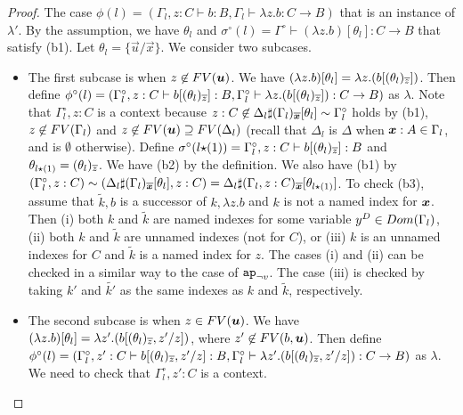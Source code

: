 \begin{proof}
  The case $\phi(l) = (\Gamma_l, z:C\vdash b:B,\Gamma_l\vdash \lambda z.b:C\to B)$
  that is an instance of $\lambda'$. 
  By the assumption, we have $\theta_l$
  and $\sigma^\circ(l)=\Gamma^\circ\vdash (\lambda z.b)[\theta_l]:C\to B$ that satisfy (b1).
  Let $\theta_l=\{\vec{u}/\vec{x}\}$. 
  We consider two subcases.
  \begin{itemize}
  \item
    The first subcase is when $z\not\in\FV(\vec{u})$.
    We have $(\lambda z.b)[\theta_l] = \lambda z.(b[(\theta_l)_{\overline{z}}])$.
    Then define $\phi^\circ(l) = (\Gamma^\circ_l, z:C\vdash b[(\theta_l)_{\overline{z}}]:B,\Gamma^\circ_l\vdash \lambda z.(b[(\theta_l)_{\overline{z}}]):C\to B)$ as $\lambda$. 
    Note that $\Gamma^\circ_l,z:C$ is a context 
    because $z:C \not\in \Delta_l\sharp(\Gamma_l)_{\overline{\boldsymbol{x}}}[\theta_l] \sim \Gamma^\circ_l$
    holds by (b1), $z\not\in {{\relax FV}}(\Gamma_l)$ and $z \not\in\FV(\vec{u}) \supseteq \FV(\Delta_l)$
    (recall that $\Delta_l$ is $\Delta$ when $\boldsymbol{x}:A\in\Gamma_l$, and is $\emptyset$ otherwise).
    Define $\sigma^\circ(l{\star}(1)) = \Gamma^\circ_l,z:C\vdash b[(\theta_l)_{\overline{z}}]:B$
    and $\theta_{l{\star}(1)} = (\theta_l)_{\overline{z}}$.
    We have (b2) by the definition. 
    We also have (b1) by $(\Gamma^\circ_l,z:C) \sim (\Delta_l\sharp(\Gamma_l)_{\overline{\boldsymbol{x}}}[\theta_l],z:C) = \Delta_l\sharp(\Gamma_l,z:C)_{\overline{\boldsymbol{x}}}[\theta_{l{\star}(1)}]$.
    To check (b3),
    assume that $\tilde{k},b$ is a successor of $k,\lambda z.b$ and $k$ is not a named index for $\boldsymbol{x}$.
    Then (i) both $k$ and $\tilde{k}$ are named indexes for some variable $y^D\in{{\relax Dom}}(\Gamma_l)$,
    (ii) both $k$ and $\tilde{k}$ are unnamed indexes (not for $C$), or
    (iii) $k$ is an unnamed indexes for $C$ and $\tilde{k}$ is a named index for $z$.
    The cases (i) and (ii) can be checked in a similar way to the case of $\apnotvar$.
    The case (iii) is checked by taking $k'$ and $\tilde{k'}$ as the same indexes as $k$ and $\tilde{k}$,
    respectively.
  \item
    The second subcase is when $z\in\FV(\vec{u})$.
    We have $(\lambda z.b)[\theta_l] = \lambda z'.(b[(\theta_l)_{\overline{z}},z'/z])$, 
    where $z' \not\in\FV(b,\vec{u})$. 
    Then define $\phi^\circ(l) = (\Gamma^\circ_l, z':C\vdash b[(\theta_l)_{\overline{z}},z'/z]:B,\Gamma^\circ_l\vdash \lambda z'.(b[(\theta_l)_{\overline{z}},z'/z]):C\to B)$ as $\lambda$. 
    We need to check that $\Gamma^\circ_l,z':C$ is a context.

\end{itemize}
\end{proof}

